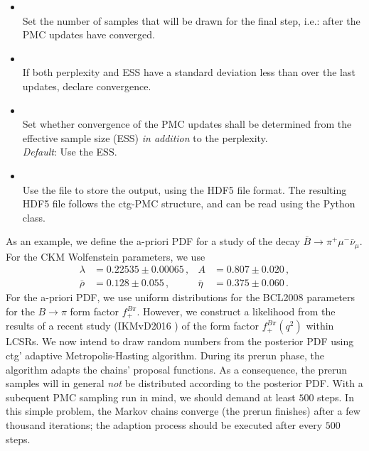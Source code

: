 \begin{itemize}
    \item[] \\[\medskipamount]
        Set the number  of samples that will be drawn for the final step,
        i.e.: after the PMC updates have converged.

    \item[] \\[\medskipamount]
        If both perplexity and ESS have a standard deviation less than  over the
        last  updates, declare convergence.

    \item[] \\[\medskipamount]
        Set whether convergence of the PMC updates shall be determined from the
        effective sample size (ESS) \emph{in addition} to the perplexity.\\
        \emph{Default}: Use the ESS.

    \item[] \\[\medskipamount]
        Use the file  to store the output, using the \gls{HDF5}
        file format.  The resulting \gls{HDF5} file follows the ctg-\gls{PMC}
        structure, and can be read using the  Python
        class.
\end{itemize}

As an example, we define the a-priori \gls{PDF} for a study of the decay $\bar{B}\to \pi^+\mu^-\bar\nu_\mu$.
For the CKM Wolfenstein parameters, we use
\begin{equation*}
\begin{aligned}
    \lambda    & = 0.22535 \pm 0.00065\,,  &
    A          & = 0.807 \pm 0.020\,,      \\
    \bar{\rho} & = 0.128 \pm 0.055\,,      &
    \bar{\eta} & = 0.375 \pm 0.060\,.
\end{aligned}
\end{equation*}
For the a-priori \gls{PDF}, we use uniform distributions for the BCL2008
\cite{Bourrely:2008za} parameters for the $B\to \pi$ form factor $f^{B\pi}_+$.
However, we construct a likelihood from the results of a recent study
(IKMvD2016 \cite{Imsong:2014oqa}) of the form factor $f^{B\pi}_+(q^2)$ within \glspl{LCSR}.
We now intend to draw random numbers from the posterior PDF using ctg' adaptive
Metropolis-Hasting algorithm.  During its prerun phase, the algorithm adapts
the chains' proposal functions. As a consequence, the prerun samples will in
general \emph{not} be distributed according to the posterior \gls{PDF}. With a subequent
PMC sampling run in mind, we should demand at least $500$ steps. In this simple
problem, the Markov chains converge (the prerun finishes) after a few thousand iterations;
the adaption process should be executed after every $500$ steps.\\

